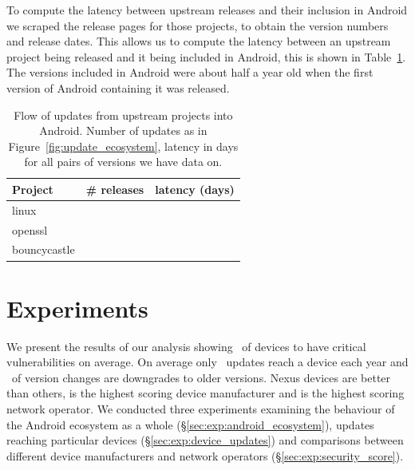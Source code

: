\documentclass[conference,a4paper,twoside]{IEEEtran}
\let\OldTodo\todo
\renewcommand{\todo}{\OldTodo[inline]}
\newcommand{\todolater}[1]{}%
\begin{document}
To compute the latency between upstream releases and their inclusion in Android we scraped the release pages for those projects, to obtain the version numbers and release dates.
This allows us to compute the latency between an upstream project being released and it being included in Android, this is shown in Table~\ref{tab:update_ecosystem}.
The versions included in Android were about half a year old when the first version of Android containing it was released.
\begin{table}
\centering
\normalsize
\begin{tabular}{l|r|r}
Project	&	\# releases	&	latency (days) \\ \hline
linux	&	\linuxNumVersions	&	\linuxMeanUpdateLatency \\
openssl	&	\opensslNumVersions	&	\opensslMeanUpdateLatency \\
bouncycastle	&	\bouncycastleNumVersions	&	\bouncycastleMeanUpdateLatency \\
\end{tabular}
\caption{Flow of updates from upstream projects into Android. Number of updates as in Figure~\ref{fig:update_ecosystem}, latency in days for all pairs of versions we have data on.\todolater{scrape the other 26 websites... is it worth it?}}
\label{tab:update_ecosystem}
\end{table}






\section{Experiments}
\label{sec:results}
We present the results of our analysis showing \daMeanInsecurityPerc\ of devices to have critical vulnerabilities on average.
On average only \daUpdatesPerYear\ updates reach a device each year and \daPercUpdatesDowngrades\ of version changes are downgrades to older versions.
Nexus devices are better than others, \emph{\daSecScoreBestmanufacturer} is the highest scoring device manufacturer and \emph{\daSecScoreBestoperator} is the highest scoring network operator.
We conducted three experiments examining the behaviour of the Android ecosystem as a whole (\S\ref{sec:exp:android_ecosystem}), updates reaching particular devices (\S\ref{sec:exp:device_updates}) and comparisons between different device manufacturers and network operators (\S\ref{sec:exp:security_score}).
\end{document}
